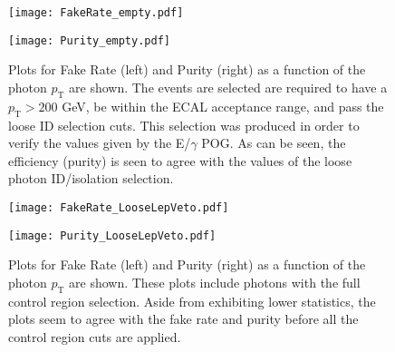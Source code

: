\begin{figure}[H]
\begin{center}
\begin{minipage}[b]{0.49\textwidth}
\texttt{[image: FakeRate\_empty.pdf]}
\end{minipage}
\begin{minipage}[b]{0.49\textwidth}
    \texttt{[image: Purity\_empty.pdf]}
\end{minipage}
\end{center}
\vspace{-1em}
\caption{Plots for Fake Rate (left) and Purity (right) as a function of the photon $p_\text{T}$ are shown. The events are selected are required to have a $p_\text{T} > 200$ GeV, be within the ECAL acceptance range, and pass the loose ID selection cuts. This selection was produced in order to verify the values given by the E/$\gamma$ POG. As can be seen, the efficiency (purity) is seen to agree with the values of the loose photon ID/isolation selection.}
\label{FakeRatePurityLoose}
\end{figure}

\begin{figure}[H]
\begin{center}
\begin{minipage}[b]{0.49\textwidth}
\texttt{[image: FakeRate\_LooseLepVeto.pdf]}
\end{minipage}
\begin{minipage}[b]{0.49\textwidth}
    \texttt{[image: Purity\_LooseLepVeto.pdf]}
\end{minipage}
\end{center}
\vspace{-1em}
\caption{Plots for Fake Rate (left) and Purity (right) as a function of the photon $p_\text{T}$ are shown. These plots include photons with the full control region selection. Aside from exhibiting lower statistics, the plots seem to agree with the fake rate and purity before all the control region cuts are applied.}
\label{FakeRatePurityCR}
\end{figure}

\vspace{1em}

